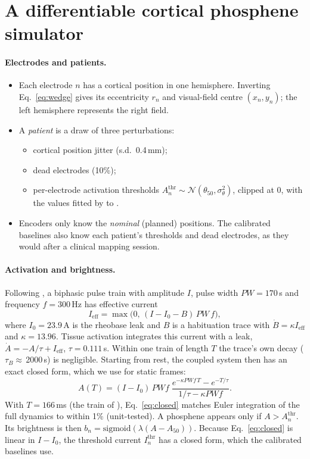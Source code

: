 \section{A differentiable cortical phosphene simulator}\label{sec:sim}
\paragraph{Electrodes and patients.}
\begin{itemize}
\item Each electrode $n$ has a cortical position in one hemisphere. Inverting Eq.~\eqref{eq:wedge} gives its eccentricity $r_n$ and visual-field centre $(x_n,y_n)$; the left hemisphere represents the right field.
\item A \emph{patient} is a draw of three perturbations:
  \begin{itemize}
  \item cortical position jitter (s.d.\ 0.4\,mm);
  \item dead electrodes (10\%);
  \item per-electrode activation thresholds $A^{\mathrm{thr}}_n\sim\mathcal N(\theta_{50},\sigma_\theta^2)$, clipped at 0, with the values fitted by \citet{vandergrinten2024towards} to \citet{fernandez2021visual}.
  \end{itemize}
\item Encoders only know the \emph{nominal} (planned) positions. The calibrated baselines also know each patient's thresholds and dead electrodes, as they would after a clinical mapping session.
\end{itemize}

\paragraph{Activation and brightness.} Following \citet{vandergrinten2024towards}, a biphasic pulse train with amplitude $I$, pulse width $PW{=}170$\,\textmu s and frequency $f{=}300$\,Hz has effective current
\begin{equation}
I_{\mathrm{eff}} = \max\!\big(0,\,(I - I_0 - B)\,PW\,f\big),
\end{equation}
where $I_0{=}23.9$\,\textmu A is the rheobase leak and $B$ is a habituation trace with $\dot B=\kappa I_{\mathrm{eff}}$ and $\kappa{=}13.96$. Tissue activation integrates this current with a leak, $\dot A=-A/\tau+I_{\mathrm{eff}}$, $\tau{=}0.111$\,s. Within one train of length $T$ the trace's own decay ($\tau_B\approx$\,2000\,s) is negligible. Starting from rest, the coupled system then has an exact closed form, which we use for static frames:
\begin{equation}
A(T) = (I-I_0)\,PW f\;\frac{e^{-\kappa PW f\, T}-e^{-T/\tau}}{1/\tau - \kappa PW f}.
\label{eq:closed}
\end{equation}
With $T{=}166$\,ms (the train of \citealp{fernandez2021visual}), Eq.~\eqref{eq:closed} matches Euler integration of the full dynamics to within 1\% (unit-tested). A phosphene appears only if $A>A^{\mathrm{thr}}_n$. Its brightness is then $b_n=\mathrm{sigmoid}(\lambda(A-A_{50}))$. Because Eq.~\eqref{eq:closed} is linear in $I-I_0$, the threshold current $I^{\mathrm{thr}}_n$ has a closed form, which the calibrated baselines use.

